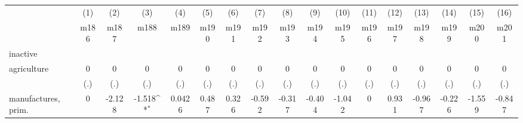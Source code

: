 {
\def\sym#1{\ifmmode^{#1}\else\(^{#1}\)\fi}
\begin{tabular}{l*{16}{c}}
\hline\hline
                    &\multicolumn{1}{c}{(1)}&\multicolumn{1}{c}{(2)}&\multicolumn{1}{c}{(3)}&\multicolumn{1}{c}{(4)}&\multicolumn{1}{c}{(5)}&\multicolumn{1}{c}{(6)}&\multicolumn{1}{c}{(7)}&\multicolumn{1}{c}{(8)}&\multicolumn{1}{c}{(9)}&\multicolumn{1}{c}{(10)}&\multicolumn{1}{c}{(11)}&\multicolumn{1}{c}{(12)}&\multicolumn{1}{c}{(13)}&\multicolumn{1}{c}{(14)}&\multicolumn{1}{c}{(15)}&\multicolumn{1}{c}{(16)}\\
                    &\multicolumn{1}{c}{m186}&\multicolumn{1}{c}{m187}&\multicolumn{1}{c}{m188}&\multicolumn{1}{c}{m189}&\multicolumn{1}{c}{m190}&\multicolumn{1}{c}{m191}&\multicolumn{1}{c}{m192}&\multicolumn{1}{c}{m193}&\multicolumn{1}{c}{m194}&\multicolumn{1}{c}{m195}&\multicolumn{1}{c}{m196}&\multicolumn{1}{c}{m197}&\multicolumn{1}{c}{m198}&\multicolumn{1}{c}{m199}&\multicolumn{1}{c}{m200}&\multicolumn{1}{c}{m201}\\
\hline
inactive            &                     &                     &                     &                     &                     &                     &                     &                     &                     &                     &                     &                     &                     &                     &                     &                     \\
agriculture         &           0         &           0         &           0         &           0         &           0         &           0         &           0         &           0         &           0         &           0         &           0         &           0         &           0         &           0         &           0         &           0         \\
                    &         (.)         &         (.)         &         (.)         &         (.)         &         (.)         &         (.)         &         (.)         &         (.)         &         (.)         &         (.)         &         (.)         &         (.)         &         (.)         &         (.)         &         (.)         &         (.)         \\
[1em]
manufactures, prim. &           0         &      -2.128         &      -1.518\sym{*}  &      0.0426         &       0.487         &       0.326         &      -0.592         &      -0.317         &      -0.404         &      -1.042         &           0         &       0.931         &      -0.967         &      -0.226         &      -1.559         &      -0.847         \\

\end{tabular}}
